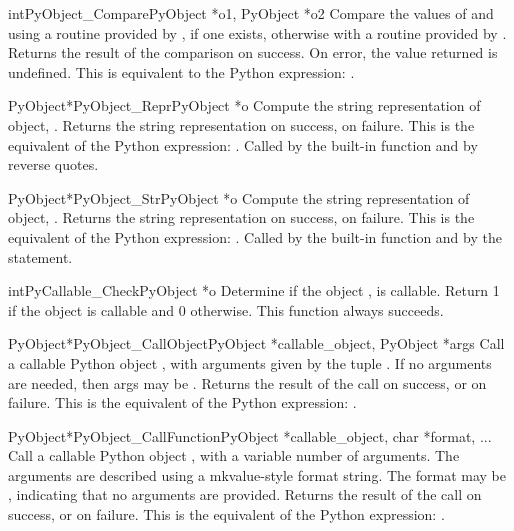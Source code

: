 \documentclass[twoside,openright]{report}
\begin{document}
\begin{cfuncdesc}{int}{PyObject_Compare}{PyObject *o1, PyObject *o2}
Compare the values of  and  using a routine provided by
, if one exists, otherwise with a routine provided by .
Returns the result of the comparison on success.  On error,
the value returned is undefined. This is equivalent to the
Python expression: .
\end{cfuncdesc}


\begin{cfuncdesc}{PyObject*}{PyObject_Repr}{PyObject *o}
Compute the string representation of object, .  Returns the
string representation on success, \NULL{} on failure.  This is
the equivalent of the Python expression: .
Called by the  built-in function and by reverse quotes.
\end{cfuncdesc}


\begin{cfuncdesc}{PyObject*}{PyObject_Str}{PyObject *o}
Compute the string representation of object, .  Returns the
string representation on success, \NULL{} on failure.  This is
the equivalent of the Python expression: .
Called by the  built-in function and by the 
statement.
\end{cfuncdesc}


\begin{cfuncdesc}{int}{PyCallable_Check}{PyObject *o}
Determine if the object , is callable.  Return 1 if the
object is callable and 0 otherwise.
This function always succeeds.
\end{cfuncdesc}


\begin{cfuncdesc}{PyObject*}{PyObject_CallObject}{PyObject *callable_object, PyObject *args}
Call a callable Python object , with
arguments given by the tuple .  If no arguments are
needed, then args may be \NULL{}.  Returns the result of the
call on success, or \NULL{} on failure.  This is the equivalent
of the Python expression: .
\end{cfuncdesc}

\begin{cfuncdesc}{PyObject*}{PyObject_CallFunction}{PyObject *callable_object, char *format, ...}
Call a callable Python object , with a
variable number of \C{} arguments. The \C{} arguments are described
using a mkvalue-style format string. The format may be \NULL{},
indicating that no arguments are provided.  Returns the
result of the call on success, or \NULL{} on failure.  This is
the equivalent of the Python expression: .
\end{cfuncdesc}
\end{document}
